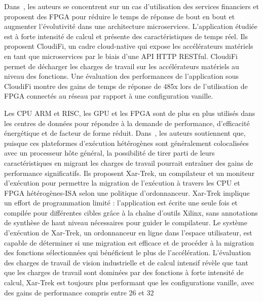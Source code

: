 Dans~\cite{diamantopoulosAccelerationasauServiceCloudnativeMonteCarlo2021}, les auteurs se concentrent sur un cas d'utilisation des services financiers et proposent des FPGA pour réduire le temps de réponse de bout en bout et augmenter l'évolutivité dans une architecture microservices. L'application étudiée est à forte intensité de calcul et présente des caractéristiques de temps réel. Ils proposent CloudiFi, un cadre cloud-native qui expose les accélérateurs matériels en tant que microservices par le biais d'une API HTTP RESTful. CloudiFi permet de décharger les charges de travail sur les accélérateurs matériels au niveau des fonctions. Une évaluation des performances de l'application sous CloudiFi montre des gains de temps de réponse de 485x lors de l'utilisation de FPGA connectés au réseau par rapport à une configuration vanille.

Les CPU ARM et RISC, les GPU et les FPGA sont de plus en plus utilisés dans les centres de données pour répondre à la demande de performance, d'efficacité énergétique et de facteur de forme réduit. Dans~\cite{hortaXartrekRuntimeExecution2021}, les auteurs soutiennent que, puisque ces plateformes d'exécution hétérogènes sont généralement colocalisées avec un processeur hôte général, la possibilité de tirer parti de leurs caractéristiques en migrant les charges de travail pourrait entraîner des gains de performance significatifs. Ils proposent Xar-Trek, un compilateur et un moniteur d'exécution pour permettre la migration de l'exécution à travers les CPU et FPGA hétérogènes-ISA selon une politique d'ordonnanceur. Xar-Trek implique un effort de programmation limité : l'application est écrite une seule fois et compilée pour différentes cibles grâce à la chaîne d'outils Xilinx, sans annotations de synthèse de haut niveau nécessaires pour guider le compilateur. Le système d'exécution de Xar-Trek, un ordonnanceur en ligne dans l'espace utilisateur, est capable de déterminer si une migration est efficace et de procéder à la migration des fonctions sélectionnées qui bénéficient le plus de l'accélération. L'évaluation des charges de travail de vision industrielle et de calcul intensif révèle que tant que les charges de travail sont dominées par des fonctions à forte intensité de calcul, Xar-Trek est toujours plus performant que les configurations vanille, avec des gains de performance compris entre 26 et 32 %

